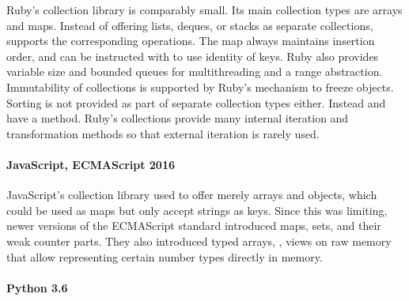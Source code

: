 \documentclass[sigconf, authorversion]{acmart}
\begin{document}
Ruby's collection library is comparably small.
Its main collection types are arrays and maps.
Instead of offering lists, deques, or stacks as separate collections,
 supports the corresponding operations.
The  map always maintains insertion order,
and can be instructed with  to use identity of keys.
Ruby also provides variable size and bounded queues for multithreading and a range abstraction.
Immutability of collections is supported by Ruby's mechanism to freeze objects.
Sorting is not provided as part of separate collection types either.
Instead  and  have a  method.
Ruby's collections provide many internal iteration
and transformation methods so that external iteration is rarely used.

\paragraph{JavaScript, ECMAScript 2016}

JavaScript's collection library used to offer merely
arrays and objects, which could be used as maps but only accept strings as keys.
Since this was limiting,
newer versions of the ECMAScript standard introduced maps, sets,
and their weak counter parts.
They also introduced typed arrays, \ie,
views on raw memory that allow representing certain number types
directly in memory.

\paragraph{Python 3.6}
\end{document}
